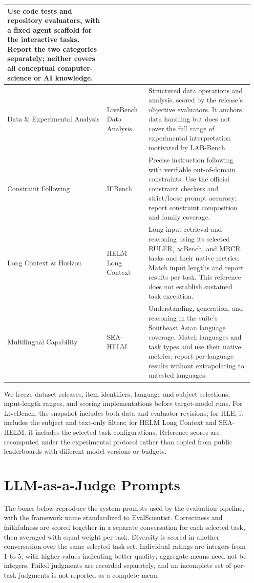 \documentclass{article} %
\begin{document}
\begin{longtable}{@{}>{\raggedright\arraybackslash}p{}>{\raggedright\arraybackslash}p{}>{\raggedright\arraybackslash}p{}@{}}
		Use code tests and repository evaluators, with a fixed agent scaffold for the
		interactive tasks. Report the two categories separately; neither covers all
		conceptual computer-science or AI knowledge. \\
		\midrule
		Data \& Experimental Analysis & LiveBench Data Analysis~\citep{white2024livebench,livebenchchangelog}
		& Structured data operations and analysis, scored by the release's objective
		evaluators. It anchors data handling but does not cover the full range of
		experimental interpretation motivated by LAB-Bench. \\
		\midrule
		Constraint Following & IFBench~\citep{pyatkin2025ifbench}
		& Precise instruction following with verifiable out-of-domain constraints.
		Use the official constraint checkers and strict/loose prompt accuracy;
		report constraint composition and family coverage. \\
		\midrule
		Long Context \& Horizon & HELM Long Context~\citep{helm2025longcontext}
		& Long-input retrieval and reasoning using its selected RULER, $\infty$Bench,
		and MRCR tasks and their native metrics. Match input lengths and report results
		per task. This reference does not establish sustained task execution. \\
		\midrule
		Multilingual Capability & SEA-HELM~\citep{susanto2025seahelm}
		& Understanding, generation, and reasoning in the suite's Southeast Asian
		language coverage. Match languages and task types and use their native metrics;
		report per-language results without extrapolating to untested languages. \\
	\end{longtable}
	\endgroup
	
	We freeze dataset releases, item identifiers, language and subject selections,
	input-length ranges, and scoring implementations before target-model runs.
	For LiveBench, the snapshot includes both data and evaluator revisions; for
	HLE, it includes the subject and text-only filters; for HELM Long Context and
	SEA-HELM, it includes the selected task configurations. Reference scores are
	recomputed under the experimental protocol rather than copied from public
	leaderboards with different model versions or budgets.
	
\section{LLM-as-a-Judge Prompts}
\label{app:laaj-prompts}

The boxes below reproduce the system prompts used by the evaluation pipeline,
with the framework name standardized to EvalScientist.
Correctness and faithfulness are scored together in a separate conversation for
each selected task, then averaged with equal weight per task. Diversity is scored
in another conversation over the same selected task set. Individual ratings are
integers from 1 to 5, with higher values indicating better quality; aggregate
means need not be integers. Failed judgments are recorded separately, and an
incomplete set of per-task judgments is not reported as a complete mean.
\end{document}
